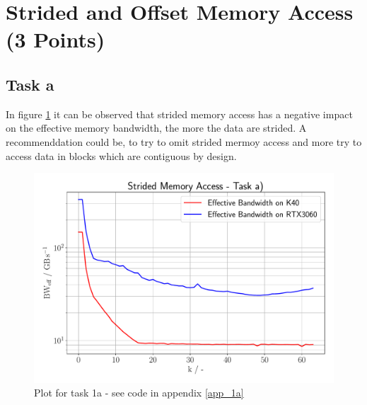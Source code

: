 \section{Strided and Offset Memory Access (3 Points)}

\subsection{Task a}
In figure \ref{task_1_a_plot} it can be observed that strided memory access has a negative
impact on the effective memory bandwidth, the more the data are strided. A recommenddation
could be, to try to omit strided mermoy access and more try to access data in blocks which
are contiguous by design.

\begin{figure}[h]
    \begin{center}
        \includegraphics[width=1\textwidth]{figures/task_1_a.pdf}
        \caption{Plot for task 1a - see code in appendix \ref{app_1a}}
        \label{task_1_a_plot}
    \end{center}
\end{figure}
\pagebreak

